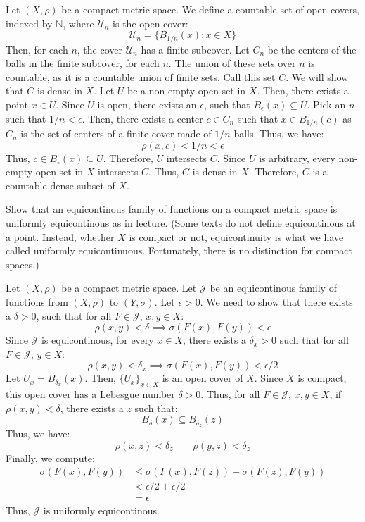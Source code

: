 \documentclass[12pt]{article}
\begin{document}
\begin{solu}
    Let $(X, \rho)$ be a compact metric space. We define a countable set of open covers, indexed by $\mathbb{N}$, where $\mathcal{U}_n$ is the open cover: 
    \[ \mathcal{U}_n = \{ B_{1/n}(x) : x \in X\} \] 
    Then, for each $n$, the cover $\mathcal{U}_n$ has a finite subcover. Let $C_n$ be the centers of the balls in the finite subcover, for each $n$. The union of these sets over $n$ is countable, as it is a countable union of finite sets. Call this set $C$. We will show that $C$ is dense in $X$. \bbni
    Let $U$ be a non-empty open set in $X$. Then, there exists a point $x \in U$. Since $U$ is open, there exists an $\epsilon$, such that $B_\epsilon(x) \subseteq U$. Pick an $n$ such that $1/n < \epsilon$. Then, there exists a center $c \in C_n$ such that $x \in B_{1/n}(c)$ as $C_n$ is the set of centers of a finite cover made of $1/n$-balls. Thus, we have:
    \[\rho(x, c) < 1/n < \epsilon\]
    Thus, $c \in B_\epsilon(x) \subseteq U$. Therefore, $U$ intersects $C$. Since $U$ is arbitrary, every non-empty open set in $X$ intersects $C$. Thus, $C$ is dense in $X$. Therefore, $C$ is a countable dense subset of $X$.
\end{solu}
\newpage

\begin{problab}{5}
    Show that an equicontinous family of functions on a compact metric space is uniformly equicontinous as in lecture. (Some texts do not define equicontinous at a point. Instead, whether $X$ is compact or not, equicontinuity is what we have called uniformly equicontinuous. Fortunately, there is no distinction for compact spaces.)
\end{problab}

\begin{solu}
    Let $(X,\rho)$ be a compact metric space. Let $\mathcal{J}$ be an equicontinous family of functions from $(X, \rho)$ to $(Y, \sigma)$. Let $\epsilon > 0$. We need to show that there exists a $\delta > 0$, such that for all $F \in \mathcal{J}$, $x, y \in X$:
    \[\rho(x,y) < \delta \implies \sigma(F(x), F(y)) < \epsilon \]
    Since $\mathcal{J}$ is equicontinous, for every $x \in X$, there exists a $\delta_x > 0$ such that for all $F \in \mathcal{J}$, $y \in X$:
    \[\rho(x,y) < \delta_x \implies \sigma(F(x), F(y)) < \epsilon/2 \]
    Let $U_x = B_{\delta_x}(x)$. Then, $\{U_x\}_{x \in X}$ is an open cover of $X$. Since $X$ is compact, this open cover has a Lebesgue number $\delta > 0$. Thus, for all $F \in \mathcal{J}$, $x, y \in X$, if $\rho(x,y) < \delta$, there exists a $z$ such that:
    \[B_\delta(x) \subseteq B_{\delta_z}(z)\]
    Thus, we have:
    \[\rho(x,z) < \delta_z \qquad \rho(y,z) < \delta_z \]
    Finally, we compute:
    \begin{align*}
        \sigma(F(x), F(y)) &\leq \sigma(F(x), F(z)) + \sigma(F(z), F(y)) \\
        &< \epsilon/2 + \epsilon/2 \\
        &= \epsilon
    \end{align*}
    Thus, $\mathcal{J}$ is uniformly equicontinous.
\end{solu}
\newpage 
\end{document}
